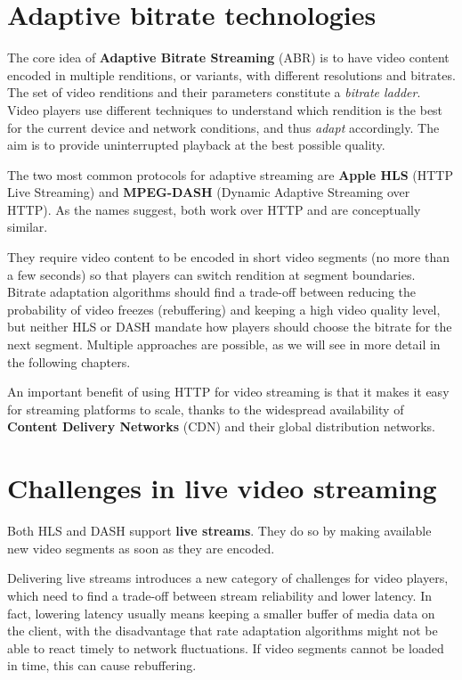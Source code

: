 \section{Adaptive bitrate technologies}
\label{sec:intro/technologies}

The core idea of \textbf{Adaptive Bitrate Streaming} (ABR) is to have video content encoded in multiple renditions, or variants, with different resolutions and bitrates. The set of video renditions and their parameters constitute a \textit{bitrate ladder}. Video players use different techniques to understand which rendition is the best for the current device and network conditions, and thus \textit{adapt} accordingly. The aim is to provide uninterrupted playback at the best possible quality.

The two most common protocols for adaptive streaming are \textbf{Apple HLS} (HTTP Live Streaming) and \textbf{MPEG-DASH} (Dynamic Adaptive Streaming over HTTP). As the names suggest, both work over HTTP and are conceptually similar.

They require video content to be encoded in short video segments (no more than a few seconds) so that players can switch rendition at segment boundaries. Bitrate adaptation algorithms should find a trade-off between reducing the probability of video freezes (rebuffering) and keeping a high video quality level, but neither HLS or DASH mandate how players should choose the bitrate for the next segment. Multiple approaches are possible, as we will see in more detail in the following chapters.

An important benefit of using HTTP for video streaming is that it makes it easy for streaming platforms to scale, thanks to the widespread availability of \textbf{Content Delivery Networks} (CDN) and their global distribution networks.

\section{Challenges in live video streaming}
\label{sec:intro/challenges}

Both HLS and DASH support \textbf{live streams}. They do so by making available new video segments as soon as they are encoded.

Delivering live streams introduces a new category of challenges for video players, which need to find a trade-off between stream reliability and lower latency. In fact, lowering latency usually means keeping a smaller buffer of media data on the client, with the disadvantage that rate adaptation algorithms might not be able to react timely to network fluctuations. If video segments cannot be loaded in time, this can cause rebuffering.

